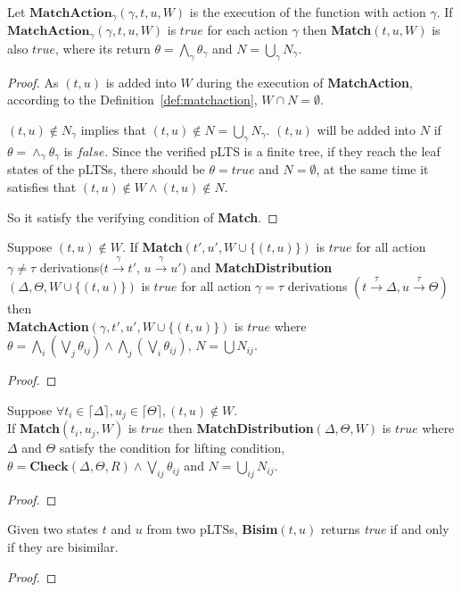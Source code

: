 \documentclass[runningheads]{llncs}
\begin{document}
\begin{proposition}Let $\textbf{MatchAction}_\gamma(\gamma,t,u,W)$ is the execution of the function with action $\gamma$.
If $\textbf{MatchAction}_\gamma(\gamma,t,u,W)$ is $true$ for each action $\gamma$ then \textbf{Match}$(t,u,W)$ is also $true$, where its return  $\theta=\bigwedge_\gamma\theta_\gamma$ and $N=\bigcup_\gamma N_\gamma$.
\end{proposition}
\begin{proof}
As $(t,u)$ is added into $W$ during the execution of \textbf{MatchAction}, according to the Definition~\ref{def:matchaction}, $W\cap N=\emptyset$. 

$(t,u)\notin N_{\gamma}$ implies that $(t,u)\notin N=\bigcup_{\gamma} N_{\gamma}$. $(t,u)$ will be added into $N$ if $\theta=\wedge_{\gamma}\theta_{\gamma}$ is $false$. Since the verified pLTS is a finite tree, if they reach the leaf states of the pLTSs, there should be $\theta=true$ and $N=\emptyset$, at the same time it satisfies that $(t,u)\notin W\wedge(t,u)\notin N$. 

So it satisfy the verifying condition of \textbf{Match}.
\end{proof}
\begin{proposition} Suppose $(t,u)\notin W$.
If \textbf{Match}$(t',u',W\cup\{(t,u)\})$ is $true$ for all action $\gamma\neq\tau$ derivations$(t\xrightarrow{\gamma}t'$, $u\xrightarrow{\gamma}u')$ and \textbf{MatchDistribution}$(\Delta,\Theta,W\cup\{(t,u)\})$ is $true$ for all action $\gamma=\tau$ derivations $(t\xrightarrow{\tau}\Delta,u\xrightarrow{\tau}\Theta)$ then\\
\textbf{MatchAction}$(\gamma,t',u',W\cup\{(t,u)\})$ is $true$ where
$\theta=\bigwedge_i(\bigvee_j\theta_{ij})\wedge\bigwedge_j(\bigvee_i\theta_{ij})$, $N=\bigcup N_{ij}$.
\end{proposition}
\begin{proof}

\end{proof}
\begin{proposition}
Suppose $\forall t_i\in\lceil\Delta\rceil,u_j\in\lceil\Theta\rceil , (t,u)\notin W$.\\
If \textbf{Match}$(t_i,u_j,W)$ is $true$ then \textbf{MatchDistribution}$(\Delta,\Theta,W)$ is $true$ where $\Delta$ and $\Theta$ satisfy the condition for lifting condition, $\theta=\textbf{Check}(\Delta,\Theta,\textit{R})\wedge\bigvee_{ij}\theta_{ij}$  and $N=\bigcup_{ij}N_{ij}$.
\end{proposition}
\begin{proof}

\end{proof}
\begin{theorem}[Correctness]

Given two states $t$ and $u$ from two pLTSs, \textbf{Bisim}$(t,u)$ returns \textit{true} if and only if they are bisimilar.
\end{theorem} 
\begin{proof}

\end{proof}
\end{document}
